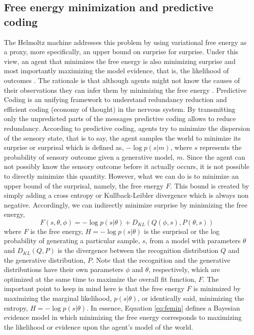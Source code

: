 \documentclass[11pt,twocolumn]{article}
\begin{document}
\subsection{Free energy minimization and predictive coding}
\label{sse:app-pc}
The Helmoltz machine addresses this problem by using variational free energy as a proxy, more specifically, an upper bound on surprise for surprise. Under this view, an agent that minimizes the free energy is also minimizing surprise and most importantly maximizing the model evidence, that is, the likelihood of outcomes \cite{dayan_helmholtz_1995}. The rationale is that although agents might not know the causes of their observations they can infer them by minimizing the free energy \cite{friston_anatomy_2013}.
Predictive Coding is an unifying framework to understand redundancy reduction and efficient coding (economy of thought) in the nervous system. By transmitting only the unpredicted parts of the messages predictive coding allows to reduce redundancy.
According to predictive coding, agents try to minimize the dispersion of the sensory state, that is to say, the agent samples the world to minimize its surprise or surprisal which is defined as, $-\log p(s|m)$, where $s$ represents the probability of sensory outcome given a generative model, $m$. Since the agent can not possibly know the sensory outcome before it actually occurs, it is not possible to directly minimize this quantity. However, what we can do is to minimize an upper bound of the surprisal, namely, the free energy $F$. This bound is created by simply adding a cross entropy or Kullback-Leibler divergence which is always non negative. Accordingly, we can indirectly minimize surprise by minimizing the free energy,
\begin{equation}
F(s,\theta,\phi) = -\log p(s|\theta) + D_{KL}(Q(\phi,s),P(\theta,s))
\label{eq:femin}
\end{equation}
where $F$ is the free energy, $H=-\log p(s|\theta)$ is the surprisal or the log probability of generating a particular sample, $s$, from a model with parameters $\theta$ and $D_{KL}(Q,P)$ is the divergence between the recognition distribution $Q$ and the generative distribution, $P$. Note that the recognition and the generative distributions have their own parameters $\phi$ and $\theta$, respectively, which are optimized at the same time to maximize the overall fit function, $F$. 
The important point to keep in mind here is that the free energy $F$ is minimized by maximizing the marginal likelihood, $p(s|\theta)$, or identically said, minimizing the entropy, $H=-\log p(s|\theta)$. 
In essence, Equation \ref{eq:femin} defines a Bayesian evidence model in which minimizing the free energy corresponds to maximizing the likelihood or evidence upon the agent's model of the world.  
\end{document}
